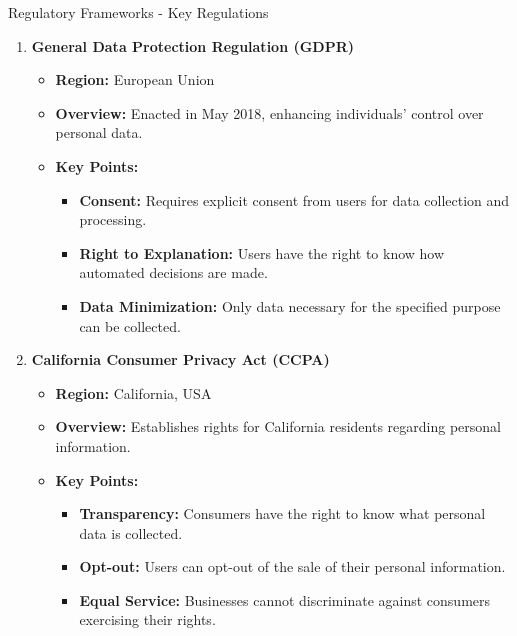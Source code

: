 \documentclass[aspectratio=169]{beamer}
\begin{document}
\begin{frame}[fragile]{Regulatory Frameworks - Key Regulations}
    \begin{enumerate}
        \item \textbf{General Data Protection Regulation (GDPR)}
            \begin{itemize}
                \item \textbf{Region:} European Union
                \item \textbf{Overview:} Enacted in May 2018, enhancing individuals' control over personal data.
                \item \textbf{Key Points:}
                \begin{itemize}
                    \item \textbf{Consent:} Requires explicit consent from users for data collection and processing.
                    \item \textbf{Right to Explanation:} Users have the right to know how automated decisions are made.
                    \item \textbf{Data Minimization:} Only data necessary for the specified purpose can be collected.
                \end{itemize}
            \end{itemize}
        
        \item \textbf{California Consumer Privacy Act (CCPA)}
            \begin{itemize}
                \item \textbf{Region:} California, USA
                \item \textbf{Overview:} Establishes rights for California residents regarding personal information.
                \item \textbf{Key Points:}
                \begin{itemize}
                    \item \textbf{Transparency:} Consumers have the right to know what personal data is collected.
                    \item \textbf{Opt-out:} Users can opt-out of the sale of their personal information.
                    \item \textbf{Equal Service:} Businesses cannot discriminate against consumers exercising their rights.
                \end{itemize}
            \end{itemize}
        

\end{enumerate}
\end{frame}
\end{document}

